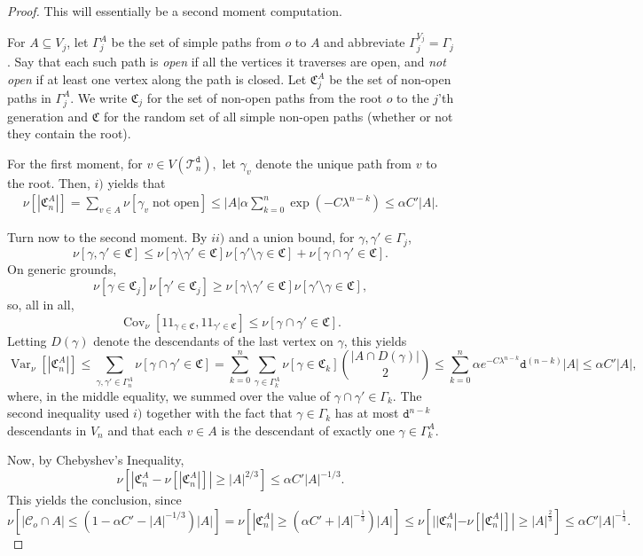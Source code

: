 \documentclass[10pt,a4paper]{amsart}
\newcommand{\id}{1\! \!1}
\begin{document}
\begin{proof}
This will essentially be a second moment computation. 



For $A\subseteq V_j$, let $\Gamma^A_j$ be the set of simple paths from $o$ to $A$ and abbreviate $\Gamma^{V_j}_j = \Gamma_j$.  Say that each such path is \emph{open} if all the vertices it traverses are open, and \emph{not open} if at least one vertex along the path is closed. Let $\mathfrak{C}^{A}_j$ be the set of non-open paths in $\Gamma^{A}_j$. We write $\mathfrak{C}_j$ for the set of non-open paths from the root $o$ to the $j$'th generation 
and $\mathfrak{C}$ for the random set of all simple non-open paths (whether or not they contain the root). 

For the first moment, for $v\in V(\mathscr{T}_n^{\mathtt{d}}),$ let $\gamma_v$ denote the unique path from $v$ to the root. Then, $i)$ yields that
\begin{align}\label{eq:expected_connection}
\nu[|\mathfrak{C}_n^A|]=\sum_{v\in A} \nu[\gamma_v\mathrm{\; not\; open}]\leq  |A|\alpha \sum_{k=0}^n\exp\left(-C \lambda^{
    n-k}\right)\leq \alpha C' |A|. 
\end{align}


Turn now to the second moment. 
By $ii)$ and a union bound, for $\gamma,\gamma'\in \Gamma_j$,
$$
\nu[\gamma,\gamma'\in \mathfrak{C}]\leq \nu[\gamma\setminus \gamma'\in \mathfrak{C}]\nu[\gamma'\setminus \gamma \in \mathfrak{C}]+\nu[\gamma\cap \gamma'\in \mathfrak{C}].
$$
On generic grounds, 
$$
\nu[\gamma\in \mathfrak{C}_j]\nu[\gamma'\in \mathfrak{C}_j]\geq \nu[\gamma\setminus \gamma'\in \mathfrak{C}]\nu[\gamma'\setminus \gamma\in\mathfrak{C}],
$$
so, all in all,
$$
\operatorname{Cov}_{\nu}[\id_{\gamma\in \mathfrak{C}},\id_{\gamma'\in \mathfrak{C}} ]\leq \nu[\gamma\cap \gamma'\in \mathfrak{C}].
$$
Letting $D(\gamma)$ denote the descendants of the last vertex on $\gamma$, this yields
$$
\operatorname{Var}_{\nu}[|\mathfrak{C}^A_n|]\leq  \sum_{\gamma,\gamma'\in \Gamma^A_n}\nu[\gamma\cap \gamma'\in \mathfrak{C}]=\sum_{k=0}^n \sum_{\gamma\in \Gamma^A_k}\nu[\gamma\in \mathfrak{C}_k] {|A\cap D(\gamma)| \choose 2}\leq \sum_{k=0}^n \alpha e^{-C \lambda^{
    n-k}} \mathtt{d}^{(n-k)} |A|\leq \alpha C' |A|,
$$
where, in the middle equality, we summed over the value of $\gamma\cap \gamma'\in \Gamma_k$.  The second inequality used $i)$ together with the fact that $\gamma\in \Gamma_k$ has at most $\mathtt{d}^{n-k}$ descendants in $V_n$ and that each $v\in A$ is the descendant of exactly one $\gamma\in \Gamma_k^A$.

Now, by Chebyshev's Inequality,
$$
\nu[|\mathfrak{C}^A_n-\nu[|\mathfrak{C}^A_n|]|\geq |A|^{2/3}]\leq  \alpha C'|A|^{-1/3}.
$$
This yields the conclusion, since %
 $$
 \nu[|\mathcal{C}_o\cap A|\leq (1-\alpha C'-|A|^{-1/3})|A|]=\nu[|\mathfrak{C}^{A}_n|\geq (\alpha C'+|A|^{-\frac{1}{3}}) |A|]\leq \nu[||\mathfrak{C}^{A}_n|-\nu[|\mathfrak{C}^{A}_n|]|\geq |A|^{\frac{2}{3}}]\leq \alpha C'|A|^{-\frac{1}{3}}.
 $$
\end{proof}
\end{document}
